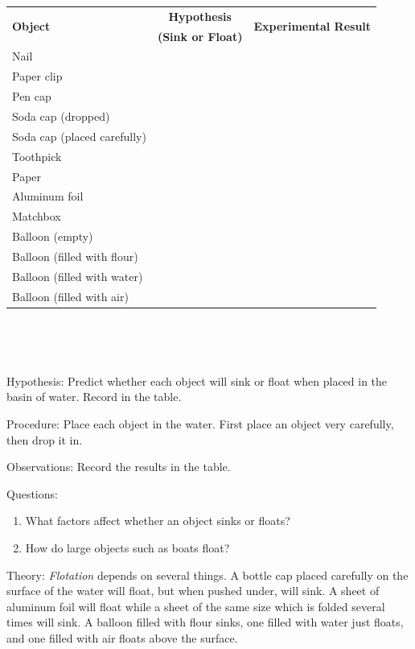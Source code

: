 \begin{description*}
{\begin{tabular}{|l|c|c|} \hline
\multirow{2}{*}{\textbf{Object}} & \textbf{Hypothesis} & \multirow{2}{*}{\textbf{Experimental Result}} \\
& \textbf{(Sink or Float)} & \\ \hline
Nail& & \\ \hline
Paper clip& & \\ \hline
Pen cap& & \\ \hline
Soda cap (dropped)& & \\ \hline
Soda cap (placed carefully)& & \\ \hline
Toothpick & & \\ \hline
Paper& & \\ \hline
Aluminum foil& & \\ \hline
Matchbox& & \\ \hline
Balloon (empty)& & \\ \hline
Balloon (filled with flour)& & \\ \hline
Balloon (filled with water)& & \\ \hline
Balloon (filled with air)& & \\ \hline
\end{tabular} \\[10pt]
}\\
\item[Hypothesis:]{Predict whether each object will sink or float when placed in the basin of water. Record in the table.}
\item[Procedure:]{Place each object in the water. First place an object very carefully, then drop it in.}
\item[Observations:]{Record the results in the table.}
\item[Questions:]{}\hfill
\begin{enumerate}
\item What factors affect whether an object sinks or floats?
\item How do large objects such as boats float?
\end{enumerate}
\item[Theory:]{\emph{Flotation} depends on several things. A bottle cap placed carefully on the surface of the water will float, but when pushed under, will sink. A sheet of aluminum foil will float while a sheet of the same size which is folded several times will sink. A balloon filled with flour sinks, one filled with water just floats, and one filled with air floats above the surface.\\

}
\end{description*}
